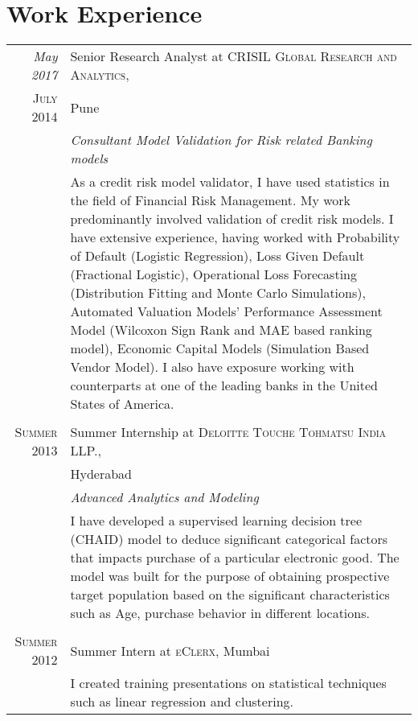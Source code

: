 \documentclass[a4paper,10pt]{article}
\begin{document}
\section{Work Experience}
\begin{tabular}{r|p{11cm}}
 \emph{May 2017} & Senior Research Analyst at \textsc{CRISIL Global Research and Analytics}, \\\textsc{July 2014}&Pune \\&\emph{Consultant Model Validation for Risk related Banking models}\\&\footnotesize{As a credit risk model validator, I have used statistics in the field of Financial Risk Management. My work predominantly involved validation of credit risk models. I have extensive experience, having worked with Probability of Default (Logistic Regression), Loss Given Default (Fractional Logistic), Operational Loss Forecasting (Distribution Fitting and Monte Carlo Simulations), Automated Valuation Models' Performance Assessment Model (Wilcoxon Sign Rank and MAE based ranking model), Economic Capital Models (Simulation Based Vendor Model). I also have exposure working with  counterparts at one of the leading banks in the United States of America.}\\\multicolumn{2}{c}{} \\
 \textsc{Summer 2013} & Summer Internship at \textsc{Deloitte Touche Tohmatsu India LLP.}, \\ & Hyderabad \\&\emph{Advanced Analytics and Modeling}\\&\footnotesize{I have developed a supervised learning decision tree (CHAID) model to deduce significant categorical factors that impacts purchase of a particular electronic good. The model was built for the purpose of obtaining prospective target population based on the significant characteristics such as Age, purchase behavior in different locations.}\\\multicolumn{2}{c}{} \\
\textsc{Summer 2012} & Summer Intern at \textsc{eClerx}, Mumbai \emph{}\\&\footnotesize{I created training presentations on statistical techniques such as linear regression and clustering.}
\end{tabular}

\end{document}
